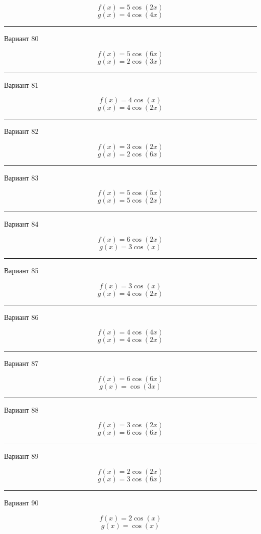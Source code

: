 \documentclass[11pt]{report}
\begin{document}
$$f(x)=5 \cos{\left(2 x \right)}$$
$$g(x)=4 \cos{\left(4 x \right)}$$

\rule{\textwidth}{.2mm}

Вариант 80

$$f(x)=5 \cos{\left(6 x \right)}$$
$$g(x)=2 \cos{\left(3 x \right)}$$

\rule{\textwidth}{.2mm}

Вариант 81

$$f(x)=4 \cos{\left(x \right)}$$
$$g(x)=4 \cos{\left(2 x \right)}$$

\rule{\textwidth}{.2mm}

Вариант 82

$$f(x)=3 \cos{\left(2 x \right)}$$
$$g(x)=2 \cos{\left(6 x \right)}$$

\rule{\textwidth}{.2mm}

Вариант 83

$$f(x)=5 \cos{\left(5 x \right)}$$
$$g(x)=5 \cos{\left(2 x \right)}$$

\rule{\textwidth}{.2mm}

Вариант 84

$$f(x)=6 \cos{\left(2 x \right)}$$
$$g(x)=3 \cos{\left(x \right)}$$

\rule{\textwidth}{.2mm}

Вариант 85

$$f(x)=3 \cos{\left(x \right)}$$
$$g(x)=4 \cos{\left(2 x \right)}$$

\rule{\textwidth}{.2mm}

Вариант 86

$$f(x)=4 \cos{\left(4 x \right)}$$
$$g(x)=4 \cos{\left(2 x \right)}$$

\rule{\textwidth}{.2mm}

Вариант 87

$$f(x)=6 \cos{\left(6 x \right)}$$
$$g(x)=\cos{\left(3 x \right)}$$

\rule{\textwidth}{.2mm}

Вариант 88

$$f(x)=3 \cos{\left(2 x \right)}$$
$$g(x)=6 \cos{\left(6 x \right)}$$

\rule{\textwidth}{.2mm}

Вариант 89

$$f(x)=2 \cos{\left(2 x \right)}$$
$$g(x)=3 \cos{\left(6 x \right)}$$

\rule{\textwidth}{.2mm}

Вариант 90

$$f(x)=2 \cos{\left(x \right)}$$
$$g(x)=\cos{\left(x \right)}$$
\end{document}
